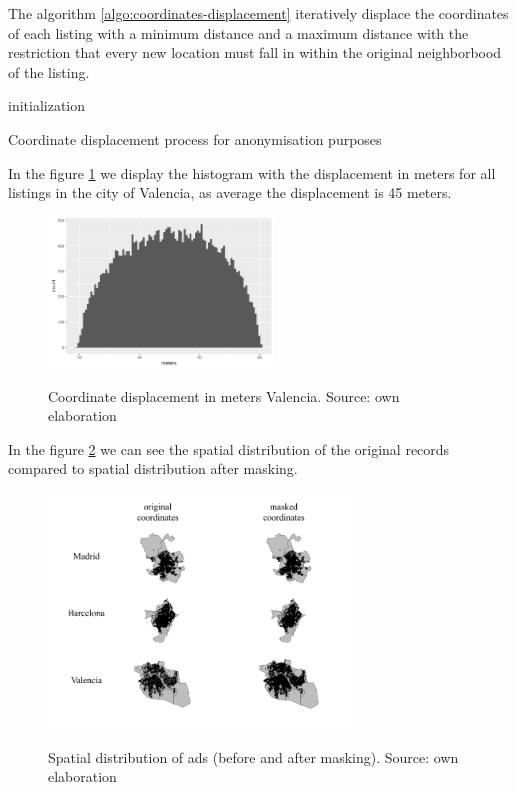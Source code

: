 \documentclass[times,final]{elsarticle}
\begin{document}
The algorithm \ref{algo:coordinates-displacement} iteratively  displace the coordinates of each listing with a minimum distance and a maximum distance with the restriction that every new location must fall in within the original neighborbood of the listing.


\begin{algorithm}[!ht]
 initialization\;
 \caption{Coordinate displacement process for anonymisation purposes}
 \label{algo:coordinates-displacement}
\end{algorithm}

In the figure \ref{fig:coordinates-displacement} we display the histogram with the displacement in meters for all listings in the city of Valencia, as average the displacement is 45 meters.

\begin{figure}[!ht]
  \caption{Coordinate displacement in meters Valencia. Source: own elaboration}
  \centering
  \includegraphics[width=6cm, height=4cm]{figures/coordinates/coordinates-valencia}
  \label{fig:coordinates-displacement}
\end{figure}


In the figure \ref{fig:points-pre-post-all} we can see the spatial distribution of the original records compared to spatial distribution after masking.

\begin{figure}[!ht]
  \caption{Spatial distribution of ads (before and after masking). Source: own elaboration}
  \centering
  \includegraphics[width=8cm]{figures/points-pre-post-all}
  \label{fig:points-pre-post-all}
\end{figure}
\end{document}
